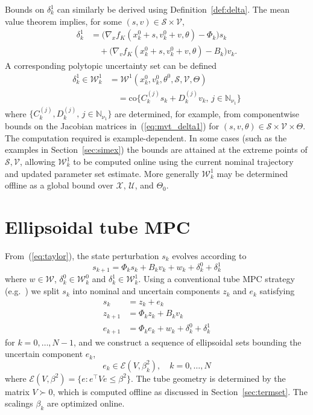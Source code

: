 \documentclass{IEEEtran}
\theoremstyle{definition}
\theoremstyle{remark}
\begin{document}
Bounds on $\delta^1_k$ can similarly be derived using Definition~\ref{def:delta}. The mean value theorem implies, for some $(s,v)\in \mathcal{S}\times \mathcal{V}$,
\begin{align}
\delta^1_k &= \bigl(\nabla_x f_K(x^0_k+s, v^0_k+v, {\theta}) - \Phi_k\bigr) s_k
\nonumber \\
&\quad + \bigl(\nabla_v f_K (x^0_k+s, v^0_k+v, {\theta})- B_k \bigr) v_k . 
\label{eq:mvt_delta1}
\end{align}
A corresponding polytopic uncertainty set can be defined
\begin{align}
\delta^1_k \in \mathcal{W}^1_k 
&= \mathcal{W}^1  (x^0_k,v^0_k,\theta^0, \mathcal{S}, \mathcal{V}, \Theta) \nonumber
\\
&\quad = \mathrm{co} \{ C^{(j)}_ks_k + D^{(j)}_k v_k, \, j \in \mathbb{N}_{\nu_{1}} \}
\label{eq:W1_def}
\end{align}
where $\{C^{(j)}_k,D^{(j)}_k,\, j \in \mathbb{N}_{\nu_{1}}\} $ are determined, for example, from componentwise bounds on the Jacobian matrices in~(\ref{eq:mvt_delta1}) for $(s,v,\theta)\in \mathcal{S}\times\mathcal{V}\times \Theta$.
%
The computation required is example-dependent. In some cases (such as the examples in Section~\ref{sec:simex}) the bounds are attained at the extreme points of $\mathcal{S}, \mathcal{V}$,
allowing $\mathcal{W}_k^1$ to be computed online using the current nominal trajectory and updated parameter set estimate. More generally $\mathcal{W}_k^1$ may be determined offline as a global bound over $\mathcal{X}$, $\mathcal{U}$, and $\Theta_0$.

\section{Ellipsoidal tube MPC}\label{sec:tube_conditions}
From~(\ref{eq:taylor}), the state perturbation $s_k$ evolves according to
\begin{equation}
s_{k+1} = \Phi_k s_k + B_k v_k + w_k + \delta^0_k + \delta^1_k
\end{equation}
where $w\in \mathcal{W}$, $\delta^0_k\in\mathcal{W}^0_k$ and $\delta^1_k\in\mathcal{W}^1_k$.
%
Using a conventional tube MPC strategy (e.g.~\cite{Kou16}) we split $s_k$ into nominal and uncertain components $z_k$ and $e_k$ satisfying
\begin{align}
s_k &= z_k + e_k \label{eq:decomp} \\
z_{k+1} &= \Phi_k z_k + B_kv_k \label{eq:z_dynamics}\\
e_{k+1} &= \Phi_k e_k + w_k + \delta^0_k + \delta^1_k
\label{eq:e_dynamics}
\end{align} 
for $k = 0,\ldots,N-1$, and we construct a sequence of ellipsoidal sets bounding the uncertain component $e_k$,
\begin{equation}\label{eq:tube_cond1}
e_k \in \mathcal{E}(V, \beta_k^2), 
\quad k = 0,\ldots,N 
\end{equation}
where $\mathcal{E}(V, \beta^2)= \{e: e^\top V e\leq \beta^2\}$.
The tube geometry is determined by the matrix $V\succ 0$, which is computed offline as discussed in Section~\ref{sec:termset}. The scalings $\beta_k$ are optimized online.
%
\end{document}
